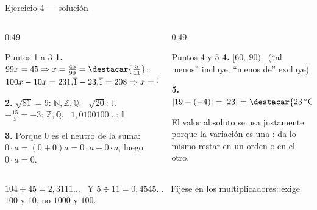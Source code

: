 \documentclass[aspectratio=169,10pt]{beamer}
\begin{document}
\begin{frame}{Ejercicio 4 — solución}
  \scriptsize
  \begin{columns}[T,onlytextwidth]
    \begin{column}{0.49\textwidth}
      \begin{block}{Puntos 1 a 3}
        \tiny
        \textbf{1.} $99x=45 \Rightarrow x=\tfrac{45}{99}
        =\destacar{\tfrac{5}{11}}$; \quad
        $100x-10x = 231{,}\overline{1}-23{,}\overline{1} = 208
        \Rightarrow x=\tfrac{208}{90}=\destacar{\tfrac{104}{45}}$

        \vspace{0.08cm}
        \textbf{2.} $\sqrt{81}=9$: $\mathbb{N},\mathbb{Z},\mathbb{Q}$. \
        $\sqrt{20}$: $\mathbb{I}$. \
        $-\tfrac{15}{5}=-3$: $\mathbb{Z},\mathbb{Q}$. \
        $1{,}0100100\dots$: $\mathbb{I}$

        \vspace{0.08cm}
        \textbf{3.} Porque $0$ es el neutro de la suma:
        $0\cdot a = (0+0)a = 0\cdot a + 0\cdot a$, luego $0\cdot a = 0$.
      \end{block}
    \end{column}
    \begin{column}{0.49\textwidth}
      \begin{block}{Puntos 4 y 5}
        \tiny
        \textbf{4.} $[60,\ 90)$ \ {\color{uniGris}(``al menos'' incluye;
        ``menos de'' excluye)}

        \vspace{0.1cm}
        \textbf{5.} $|19-(-4)| = |23| = \destacar{23\,^{\circ}\text{C}}$

        \vspace{0.06cm}
        {\color{uniGris} El valor absoluto se usa justamente porque la
        variación es una : da lo mismo restar en un orden o en
        el otro.}
      \end{block}
    \end{column}
  \end{columns}

  \vspace{0.06cm}
  {\tiny\color{uniGris}  $104\div 45 = 2{,}3111\dots$
  \checkmark \ Y $5\div 11 = 0{,}4545\dots$ \checkmark \ Fíjese en los
  multiplicadores:  exige $100$ y $10$, no
  $1000$ y $100$.}
\end{frame}
\end{document}
